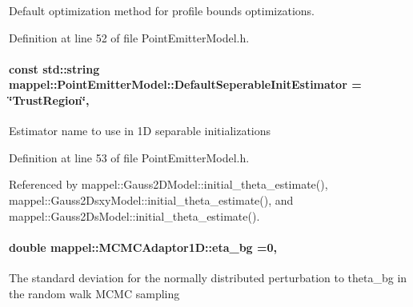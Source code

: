 Default optimization method for profile bounds optimizations. 



Definition at line 52 of file Point\+Emitter\+Model.\+h.

\paragraph[{\texorpdfstring{Default\+Seperable\+Init\+Estimator}{DefaultSeperableInitEstimator}}]{\setlength{\rightskip}{0pt plus 5cm}const std\+::string mappel\+::\+Point\+Emitter\+Model\+::\+Default\+Seperable\+Init\+Estimator = \char`\"{}Trust\+Region\char`\"{}\hspace{0.3cm}{\ttfamily [static]}, {\ttfamily [inherited]}}\hypertarget{classmappel_1_1PointEmitterModel_ad8c3dc629d75d22f25855a5f1ba8729f}{}\label{classmappel_1_1PointEmitterModel_ad8c3dc629d75d22f25855a5f1ba8729f}
Estimator name to use in 1D separable initializations 

Definition at line 53 of file Point\+Emitter\+Model.\+h.



Referenced by mappel\+::\+Gauss2\+D\+Model\+::initial\+\_\+theta\+\_\+estimate(), mappel\+::\+Gauss2\+Dsxy\+Model\+::initial\+\_\+theta\+\_\+estimate(), and mappel\+::\+Gauss2\+Ds\+Model\+::initial\+\_\+theta\+\_\+estimate().

\paragraph[{\texorpdfstring{eta\+\_\+bg}{eta_bg}}]{\setlength{\rightskip}{0pt plus 5cm}double mappel\+::\+M\+C\+M\+C\+Adaptor1\+D\+::eta\+\_\+bg =0\hspace{0.3cm}{\ttfamily [protected]}, {\ttfamily [inherited]}}\hypertarget{classmappel_1_1MCMCAdaptor1D_af54c93421b8e298289cbb92743c6b3d5}{}\label{classmappel_1_1MCMCAdaptor1D_af54c93421b8e298289cbb92743c6b3d5}
The standard deviation for the normally distributed perturbation to theta\+\_\+bg in the random walk M\+C\+MC sampling 

